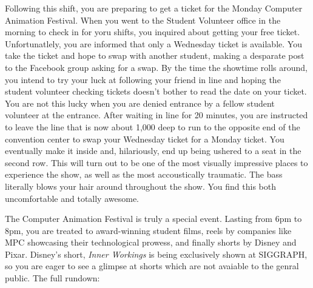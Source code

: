\documentclass[../main.tex]{subfiles}
\begin{document}
Following this shift, you are preparing to get a ticket for the Monday Computer Animation Festival. When you went to the Student Volunteer office in the morning to check in for yoru shifts, you inquired about getting your free ticket. Unfortunatlely, you are informed that only a Wednesday ticket is available. You take the ticket and hope to swap with another student, making a desparate post to the Facebook group asking for a swap. By the time the showtime rolls around, you intend to try your luck at following your friend in line and hoping the student volunteer checking tickets doesn't bother to read the date on your ticket. You are not this lucky when you are denied entrance by a fellow student volunteer at the entrance. After waiting in line for 20 minutes, you are instructed to leave the line that is now about 1,000 deep to run to the opposite end of the convention center to swap your Wednesday ticket for a Monday ticket. You eventually make it inside and, hilariously, end up being ushered to a seat in the second row. This will turn out to be one of the most visually impressive places to experience the show, as well as the most accoustically traumatic. The bass literally blows your hair around throughout the show. You find this both uncomfortable and totally awesome.

The Computer Animation Festival is truly a special event. Lasting from 6pm to 8pm, you are treated to award-winning student films, reels by companies like MPC showcasing their technological prowess, and finally shorts by Disney and Pixar. Disney's short, \textit{Inner Workings} is being exclusively shown at SIGGRAPH, so you are eager to see a glimpse at shorts which are not avaiable to the genral public. The full rundown:
\end{document}
